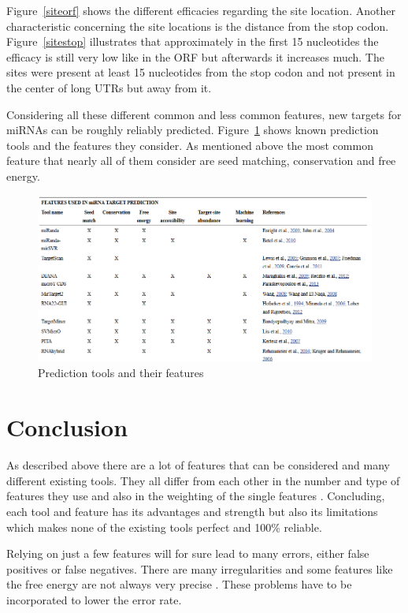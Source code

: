 \documentclass[12pt]{article}
\begin{document}
Figure~\ref{siteorf} shows the different efficacies regarding the site location. Another characteristic concerning the site locations is the distance from the stop codon. Figure~\ref{sitestop} illustrates that approximately in the first 15 nucleotides the efficacy is still very low like in the ORF but afterwards it increases much. 
The sites were present at least 15 nucleotides from the stop codon and not present in the center of long UTRs but away from it. 
   
Considering all these different common and less common features, new targets for miRNAs can be roughly reliably predicted. Figure~\ref{fig:tools} shows known prediction tools and the features they consider. As mentioned above the most common feature that nearly all of them consider are seed matching, conservation and free energy. 


\begin{figure}[h]
\centering
\includegraphics[scale=0.5]{results/tools.PNG}
\caption{Prediction tools and their features}
\label{fig:tools}
\end{figure}


\vspace{2cm}

\section{Conclusion}

As described above there are a lot of features that can be considered and many different existing tools. They all differ from each other in the number and type of features they use and also in the weighting of the single features \cite{Peterson}. Concluding, each tool and feature has its advantages and strength but also its limitations which makes none of the existing tools perfect and 100\% reliable.

Relying on just a few features will for sure lead to many errors, either false positives or false negatives. There are many irregularities and some features like the free energy are not always very precise \cite{Peterson}. These problems have to be incorporated to lower the error rate.
\end{document}
